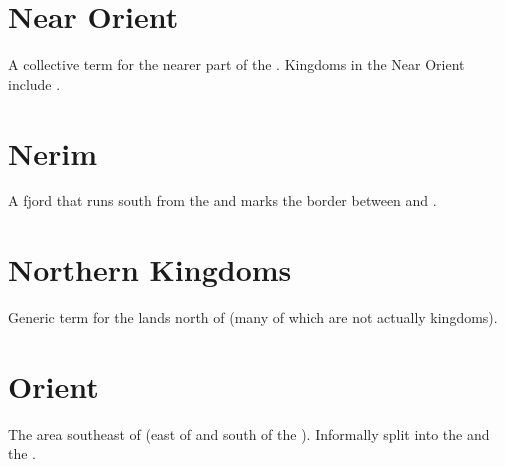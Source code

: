 \section{Near Orient}
A collective term for the nearer part of the . 
Kingdoms in the Near Orient include . 
















\section{Nerim} 
A fjord that runs south from the  and marks the border between  and . 
















\section{Northern Kingdoms}
Generic term for the lands north of  (many of which are not actually kingdoms). 
















\section{Orient}
The area southeast of  (east of  and south of the ). 
Informally split into the  and the .  
















